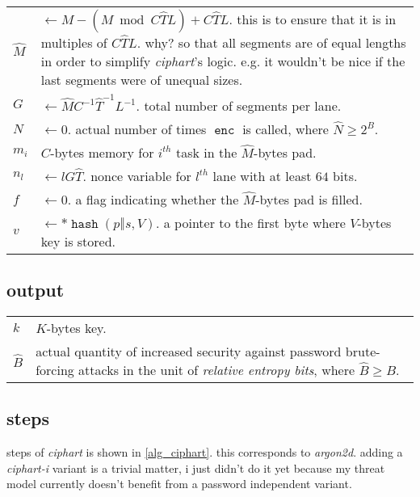 \documentclass[twocolumn]{article}
\DeclareMathOperator{\enc}{\mathtt{enc}}
\DeclareMathOperator{\hash}{\mathtt{hash}}
\begin{document}
\begin{tabularx}{\columnwidth}{lX}
    $\hat M$    & $\gets M - (M \bmod C\hat TL) + C\hat TL$.  this is to
                    ensure that it is in multiples of $C\hat TL$.  why?  so
                    that all segments are of equal lengths in order to
                    simplify \emph{ciphart}'s logic.  e.g. it wouldn't be
                    nice if the last segments were of unequal sizes.\\
    $G$         & $\gets \hat MC^{-1}\hat T^{-1}L^{-1}$.  total number of
                    segments per lane.\\
    $N$    & $\gets 0$.  actual number of times $\enc$ is called,
                    where $\hat N \ge 2^B$.\\
    $m_i$       & $C$-bytes memory for $i^{th}$ task in the $\hat M$-bytes
                    pad.\\
    $n_l$       & $\gets lG\hat T$.  nonce variable for $l^{th}$ lane with
                    at least $64$ bits.\\
    $f$         & $\gets 0$.  a flag indicating whether the $\hat M$-bytes
                    pad is filled.\\
    $v$         & $\gets *\hash(p \mathbin\Vert s, V)$.  a pointer to the
                    first byte where $V$-bytes key is stored.\\
\end{tabularx}

\subsection{output}
\begin{tabularx}{\columnwidth}{lX}
$k$ & $K$-bytes key.\\
$\hat B$ & actual quantity of increased security against password
            brute-forcing attacks in the unit of \emph{relative entropy
            bits}, where $\hat B \ge B$.\\
\end{tabularx}

\subsection{steps}
steps of \emph{ciphart} is shown in \cref{alg_ciphart}.  this corresponds
to \emph{argon2d}.  adding a \emph{ciphart-i} variant is a trivial matter,
i just didn't do it yet because my threat model currently doesn't benefit
from a password independent variant.
\end{document}
